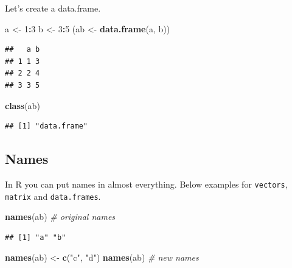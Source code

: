 \documentclass[12pt,graybox,envcountchap,sectrefs]{krantz}
\makeatletter
\newenvironment{Shaded}{\begin{snugshade}}{\end{snugshade}}
\newcommand{\KeywordTok}[1]{\textcolor[rgb]{0.13,0.29,0.53}{\textbf{#1}}}
\newcommand{\DecValTok}[1]{\textcolor[rgb]{0.00,0.00,0.81}{#1}}
\newcommand{\StringTok}[1]{\textcolor[rgb]{0.31,0.60,0.02}{#1}}
\newcommand{\CommentTok}[1]{\textcolor[rgb]{0.56,0.35,0.01}{\textit{#1}}}
\newcommand{\OperatorTok}[1]{\textcolor[rgb]{0.81,0.36,0.00}{\textbf{#1}}}
\newcommand{\NormalTok}[1]{#1}
\newenvironment{kframe}{%
\medskip{}
\setlength{\fboxsep}{.8em}
 \def\at@end@of@kframe{}%
 \ifinner\ifhmode%
  \def\at@end@of@kframe{\end{minipage}}%
  \begin{minipage}{\columnwidth}%
 \fi\fi%
 \def\FrameCommand##1{\hskip\@totalleftmargin \hskip-\fboxsep
 \colorbox{shadecolor}{##1}\hskip-\fboxsep
     \hskip-\linewidth \hskip-\@totalleftmargin \hskip\columnwidth}%
 \MakeFramed {\advance\hsize-\width
   \@totalleftmargin\z@ \linewidth\hsize
   \@setminipage}}%
 {\par\unskip\endMakeFramed%
 \at@end@of@kframe}
\renewenvironment{Shaded}{\begin{kframe}}{\end{kframe}}
\theoremstyle{definition}
\theoremstyle{definition}
\theoremstyle{definition}
\theoremstyle{remark}
\makeatother
\begin{document}
Let's create a data.frame.

\begin{Shaded}
\begin{Highlighting}[]
\NormalTok{a <-}\StringTok{ }\DecValTok{1}\OperatorTok{:}\DecValTok{3}
\NormalTok{b <-}\StringTok{ }\DecValTok{3}\OperatorTok{:}\DecValTok{5}
\NormalTok{(ab <-}\StringTok{ }\KeywordTok{data.frame}\NormalTok{(a, b))}
\end{Highlighting}
\end{Shaded}

\begin{verbatim}
##   a b
## 1 1 3
## 2 2 4
## 3 3 5
\end{verbatim}

\begin{Shaded}
\begin{Highlighting}[]
\KeywordTok{class}\NormalTok{(ab)}
\end{Highlighting}
\end{Shaded}

\begin{verbatim}
## [1] "data.frame"
\end{verbatim}

\subsection{Names}\label{names}

In R you can put names in almost everything. Below examples for
\texttt{vectors}, \texttt{matrix} and \texttt{data.frames}.

\begin{Shaded}
\begin{Highlighting}[]
\KeywordTok{names}\NormalTok{(ab)                }\CommentTok{# original names}
\end{Highlighting}
\end{Shaded}

\begin{verbatim}
## [1] "a" "b"
\end{verbatim}

\begin{Shaded}
\begin{Highlighting}[]
\KeywordTok{names}\NormalTok{(ab) <-}\StringTok{ }\KeywordTok{c}\NormalTok{(}\StringTok{"c"}\NormalTok{, }\StringTok{"d"}\NormalTok{)}
\KeywordTok{names}\NormalTok{(ab)                }\CommentTok{# new names}
\end{Highlighting}
\end{Shaded}
\end{document}
